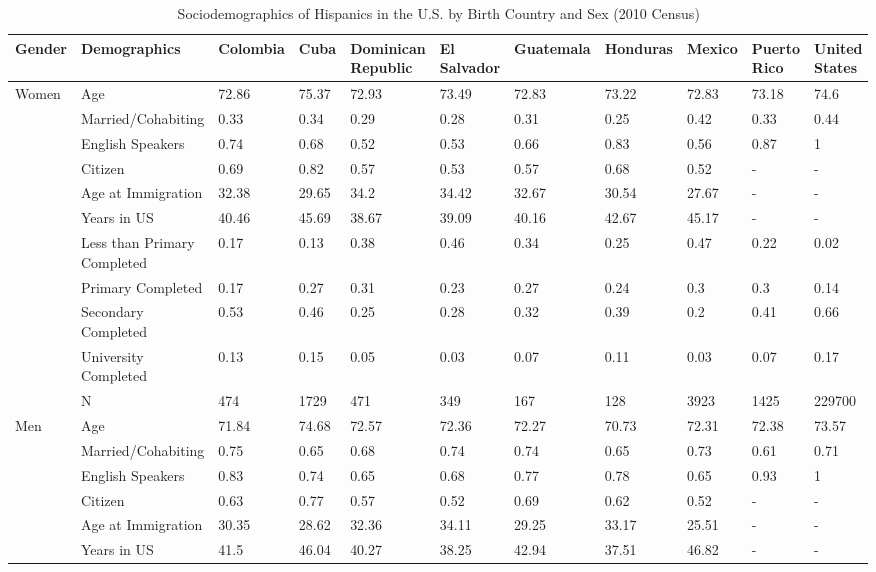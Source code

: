 \documentclass[
]{article}
\begin{document}
\begin{landscape}
\begin{table}[ht]
\centering
\caption{Sociodemographics of Hispanics in the U.S. by Birth Country and Sex (2010 Census)} 
\begingroup\small
\begin{tabular}{l|l|lllllllll}
  \hline
Gender & Demographics & Colombia & Cuba & Dominican Republic & El Salvador & Guatemala & Honduras & Mexico & Puerto Rico & United States \\ 
  \hline
Women & Age & 72.86 & 75.37 & 72.93 & 73.49 & 72.83 & 73.22 & 72.83 & 73.18 & 74.6 \\ 
   & Married/Cohabiting & 0.33 & 0.34 & 0.29 & 0.28 & 0.31 & 0.25 & 0.42 & 0.33 & 0.44 \\ 
   & English Speakers & 0.74 & 0.68 & 0.52 & 0.53 & 0.66 & 0.83 & 0.56 & 0.87 & 1 \\ 
   & Citizen & 0.69 & 0.82 & 0.57 & 0.53 & 0.57 & 0.68 & 0.52 & - & - \\ 
   & Age at Immigration & 32.38 & 29.65 & 34.2 & 34.42 & 32.67 & 30.54 & 27.67 & - & - \\ 
   & Years in US & 40.46 & 45.69 & 38.67 & 39.09 & 40.16 & 42.67 & 45.17 & - & - \\ 
   & Less than Primary Completed & 0.17 & 0.13 & 0.38 & 0.46 & 0.34 & 0.25 & 0.47 & 0.22 & 0.02 \\ 
   & Primary Completed & 0.17 & 0.27 & 0.31 & 0.23 & 0.27 & 0.24 & 0.3 & 0.3 & 0.14 \\ 
   & Secondary Completed & 0.53 & 0.46 & 0.25 & 0.28 & 0.32 & 0.39 & 0.2 & 0.41 & 0.66 \\ 
   & University Completed & 0.13 & 0.15 & 0.05 & 0.03 & 0.07 & 0.11 & 0.03 & 0.07 & 0.17 \\ 
   & N & 474 & 1729 & 471 & 349 & 167 & 128 & 3923 & 1425 & 229700 \\ 
  Men & Age & 71.84 & 74.68 & 72.57 & 72.36 & 72.27 & 70.73 & 72.31 & 72.38 & 73.57 \\ 
   & Married/Cohabiting & 0.75 & 0.65 & 0.68 & 0.74 & 0.74 & 0.65 & 0.73 & 0.61 & 0.71 \\ 
   & English Speakers & 0.83 & 0.74 & 0.65 & 0.68 & 0.77 & 0.78 & 0.65 & 0.93 & 1 \\ 
   & Citizen & 0.63 & 0.77 & 0.57 & 0.52 & 0.69 & 0.62 & 0.52 & - & - \\ 
   & Age at Immigration & 30.35 & 28.62 & 32.36 & 34.11 & 29.25 & 33.17 & 25.51 & - & - \\ 
   & Years in US & 41.5 & 46.04 & 40.27 & 38.25 & 42.94 & 37.51 & 46.82 & - & - \\ 

\end{tabular}
\end{table}
\end{landscape}
\end{document}
